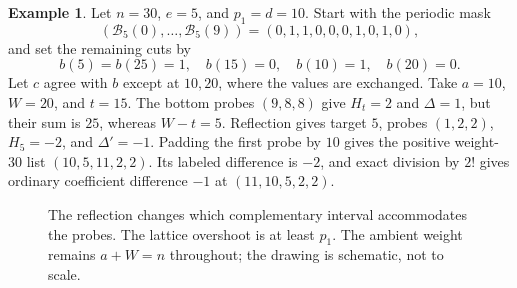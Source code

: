 \documentclass[11pt,a4paper]{amsart}
\numberwithin{equation}{section}
\theoremstyle{plain}
\theoremstyle{definition}
\newtheorem{example}[theorem]{Example}
\begin{document}
\begin{example}\label{ex:reflection}
Let \(n=30\), \(e=5\), and \(p_1=d=10\).  Start with the periodic mask
\[
(\mathcal B_5(0),\ldots,\mathcal B_5(9))=(0,1,1,0,0,0,1,0,1,0),
\]
and set the remaining cuts by
\[
b(5)=b(25)=1,\quad b(15)=0,\quad b(10)=1,\quad b(20)=0.
\]
Let \(c\) agree with \(b\) except at \(10,20\), where the values are
exchanged.  Take \(a=10\), \(W=20\), and \(t=15\).  The bottom probes
\((9,8,8)\) give \(H_t=2\) and \(\Delta=1\), but their sum is \(25\),
whereas \(W-t=5\).  Reflection gives target \(5\), probes \((1,2,2)\),
\(H_5=-2\), and \(\Delta'=-1\).  Padding the first probe by \(10\)
gives the positive weight-\(30\) list \((10,5,11,2,2)\).  Its labeled
difference is \(-2\), and exact division by \(2!\) gives ordinary
coefficient difference \(-1\) at \((11,10,5,2,2)\).
\end{example}

\begin{figure}[ht]
\centering
{}
\caption{The reflection changes which complementary interval accommodates
the probes.  The lattice overshoot is at least \(p_1\).  The ambient weight
remains \(a+W=n\) throughout; the drawing is schematic, not to scale.}
\label{fig:packing}
\end{figure}
\end{document}
